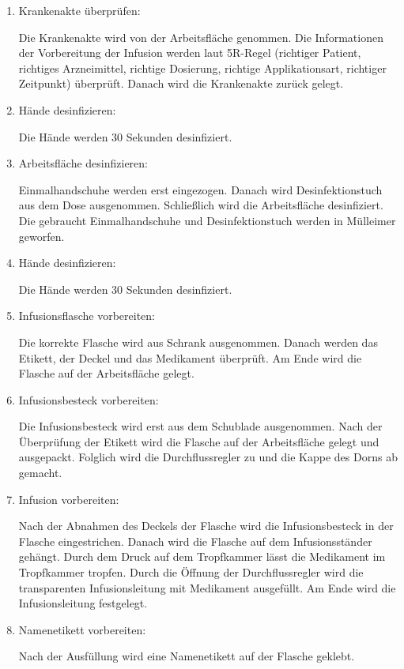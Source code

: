   \begin{enumerate}[start=0]
      \item Krankenakte überprüfen:
      
      Die Krankenakte wird von der Arbeitsfläche genommen. Die Informationen der Vorbereitung der Infusion werden laut 5R-Regel (richtiger Patient, richtiges Arzneimittel, richtige Dosierung, richtige Applikationsart, richtiger Zeitpunkt) überprüft. Danach wird die Krankenakte zurück gelegt.
      
      \item Hände desinfizieren:
      
      Die Hände werden 30 Sekunden desinfiziert.
      
      \item Arbeitsfläche desinfizieren:
      
      Einmalhandschuhe werden erst eingezogen. Danach wird Desinfektionstuch aus dem Dose ausgenommen. Schließlich wird die Arbeitsfläche desinfiziert. Die gebraucht Einmalhandschuhe und Desinfektionstuch werden in Mülleimer geworfen.
      \item Hände desinfizieren:
      
      Die Hände werden 30 Sekunden desinfiziert.
      
      \item Infusionsflasche vorbereiten:
      
      Die korrekte Flasche wird aus Schrank ausgenommen. Danach werden das Etikett, der Deckel und das Medikament überprüft. Am Ende wird die Flasche auf der Arbeitsfläche gelegt.
      
      \item Infusionsbesteck vorbereiten:
      
      Die Infusionsbesteck wird erst aus dem Schublade ausgenommen. Nach der Überprüfung der Etikett wird die Flasche auf der Arbeitsfläche gelegt und ausgepackt. Folglich wird die Durchflussregler zu und die Kappe des Dorns ab gemacht.
      
      \item Infusion vorbereiten:
      
      Nach der Abnahmen des Deckels der Flasche wird die Infusionsbesteck in der Flasche eingestrichen. Danach wird die Flasche auf dem Infusionsständer gehängt. Durch dem Druck auf dem Tropfkammer lässt die Medikament im Tropfkammer tropfen. Durch die Öffnung der Durchflussregler wird die transparenten Infusionsleitung mit Medikament ausgefüllt. Am Ende wird die Infusionsleitung festgelegt.
      
      \item Namenetikett vorbereiten:
      
      Nach der Ausfüllung wird eine Namenetikett auf der Flasche geklebt.
      
  \end{enumerate}
      
